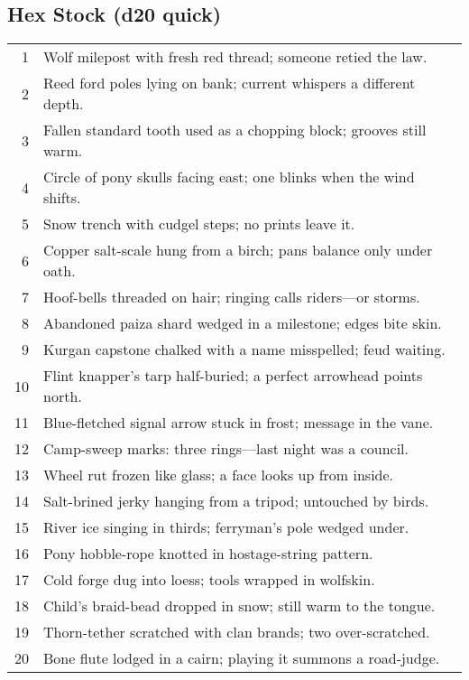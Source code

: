 \subsection*{Hex Stock (d20 quick)}
\begin{tabular}{r l}
1 & Wolf milepost with fresh red thread; someone retied the law. \\
2 & Reed ford poles lying on bank; current whispers a different depth. \\
3 & Fallen standard tooth used as a chopping block; grooves still warm. \\
4 & Circle of pony skulls facing east; one blinks when the wind shifts. \\
5 & Snow trench with cudgel steps; no prints leave it. \\
6 & Copper salt-scale hung from a birch; pans balance only under oath. \\
7 & Hoof-bells threaded on hair; ringing calls riders—or storms. \\
8 & Abandoned paiza shard wedged in a milestone; edges bite skin. \\
9 & Kurgan capstone chalked with a name misspelled; feud waiting. \\
10 & Flint knapper’s tarp half-buried; a perfect arrowhead points north. \\
11 & Blue-fletched signal arrow stuck in frost; message in the vane. \\
12 & Camp-sweep marks: three rings—last night was a council. \\
13 & Wheel rut frozen like glass; a face looks up from inside. \\
14 & Salt-brined jerky hanging from a tripod; untouched by birds. \\
15 & River ice singing in thirds; ferryman’s pole wedged under. \\
16 & Pony hobble-rope knotted in hostage-string pattern. \\
17 & Cold forge dug into loess; tools wrapped in wolfskin. \\
18 & Child’s braid-bead dropped in snow; still warm to the tongue. \\
19 & Thorn-tether scratched with clan brands; two over-scratched. \\
20 & Bone flute lodged in a cairn; playing it summons a road-judge. \\
\end{tabular}

